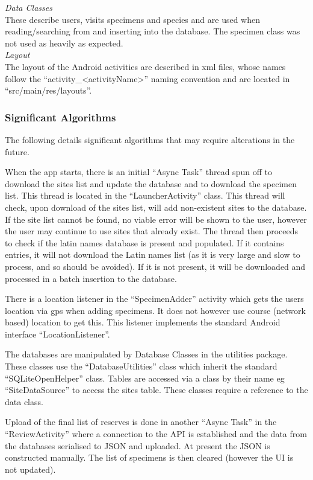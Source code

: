         \emph{Data Classes}\\
        These describe users, visits specimens and species and are used when reading/searching from and inserting into the database. The specimen class was not used as heavily as expected.\\

        \emph{Layout}\\
        The layout of the Android activities are described in xml files, whose names follow the ``activity\_<activityName>'' naming convention and are located in ``src/main/res/layouts''.

    \subsubsection{Significant Algorithms}
        The following details significant algorithms that may require alterations in the future.

        When the app starts, there is an initial ``Async Task'' thread spun off to download the sites list and update the database and to download the specimen list. This thread is located in the ``LauncherActivity'' class. This thread will check, upon download of the sites list, will add non-existent sites to the database. If the site list cannot be found, no viable error will be shown to the user, however the user may continue to use sites that already exist. The thread then proceeds to check if the latin names database is present and populated. If it contains entries, it will not download the Latin names list (as it is very large and slow to process, and so should be avoided). If it is not present, it will be downloaded and processed in a batch insertion to the database.

        There is a location listener in the ``SpecimenAdder'' activity which gets the users location via gps when adding specimens. It does not however use course (network based) location to get this. This listener implements the standard Android interface ``LocationListener''. 

        The databases are manipulated by Database Classes in the utilities package. These classes use the ``DatabaseUtilities'' class which inherit the standard ``SQLiteOpenHelper'' class. Tables are accessed via a class by their name eg ``SiteDataSource'' to access the sites table. These classes require a reference to the data class.

        Upload of the final list of reserves is done in another ``Async Task'' in the ``ReviewActivity'' where a connection to the API is established and the data from the databases serialised to JSON and uploaded. At present the JSON is constructed manually. The list of specimens is then cleared (however the UI is not updated).
    
